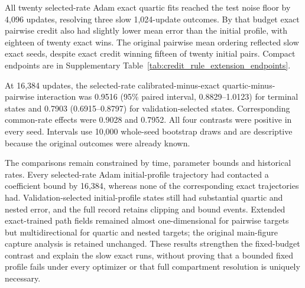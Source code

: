 All twenty selected-rate Adam exact quartic fits reached the test noise floor by 4,096 updates, resolving three slow 1,024-update outcomes. By that budget exact pairwise credit also had slightly lower mean error than the initial profile, with eighteen of twenty exact wins. The original pairwise mean ordering reflected slow exact seeds, despite exact credit winning fifteen of twenty initial pairs. Compact endpoints are in Supplementary Table~\ref{tab:credit_rule_extension_endpoints}.

At 16,384 updates, the selected-rate calibrated-minus-exact quartic-minus-pairwise interaction was 0.9516 (95\% paired interval, 0.8829--1.0123) for terminal states and 0.7903 (0.6915--0.8797) for validation-selected states. Corresponding common-rate effects were 0.9028 and 0.7952. All four contrasts were positive in every seed. Intervals use 10,000 whole-seed bootstrap draws and are descriptive because the original outcomes were already known.

The comparisons remain constrained by time, parameter bounds and historical rates. Every selected-rate Adam initial-profile trajectory had contacted a coefficient bound by 16,384, whereas none of the corresponding exact trajectories had. Validation-selected initial-profile states still had substantial quartic and nested error, and the full record retains clipping and bound events. Extended exact-trained path fields remained almost one-dimensional for pairwise targets but multidirectional for quartic and nested targets; the original main-figure capture analysis is retained unchanged. These results strengthen the fixed-budget contrast and explain the slow exact runs, without proving that a bounded fixed profile fails under every optimizer or that full compartment resolution is uniquely necessary.
